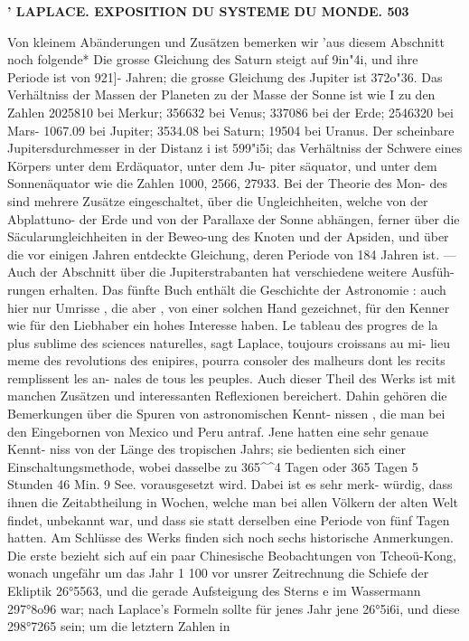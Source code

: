 \documentclass[12pt,a4paper]{article}
\begin{document}
\vspace{0.5em}


\noindent\textbf{'    LAPLACE.     EXPOSITION  DU  SYSTEME  DU  MONDE.  503}

Von  kleinem  Abänderungen  und  Zusätzen  bemerken  wir  'aus  diesem  Abschnitt  noch  folgende* Die  grosse  Gleichung  des  Saturn  steigt  auf  9in"4i,  und  ihre  Periode  ist  von  921]-  Jahren;  die  grosse Gleichung  des  Jupiter  ist  372o"36.  Das  Verhältniss  der  Massen  der  Planeten  zu  der  Masse  der  Sonne ist  wie  I  zu  den  Zahlen  2025810  bei  Merkur;  356632  bei  Venus;  337086  bei  der  Erde;  2546320  bei  Mars- 1067.09  bei  Jupiter;  3534.08  bei  Saturn;  19504  bei  Uranus.  Der  scheinbare  Jupitersdurchmesser  in  der Distanz  i  ist  599"i5i;  das  Verhältniss  der  Schwere  eines  Körpers  unter  dem  Erdäquator,  unter  dem  Ju- piter säquator,  und  unter  dem  Sonnenäquator  wie  die  Zahlen  1000,  2566,  27933.  Bei  der  Theorie  des  Mon- des sind  mehrere  Zusätze  eingeschaltet,  über  die  Ungleichheiten,  welche  von  der  Abplattuno-  der  Erde und  von  der  Parallaxe  der  Sonne  abhängen,  ferner  über  die  Säcularungleichheiten  in  der  Beweo-ung des  Knoten  und  der  Apsiden,  und  über  die  vor  einigen  Jahren  entdeckte  Gleichung,  deren  Periode  von 184  Jahren  ist.  ---  Auch  der  Abschnitt  über  die  Jupiterstrabanten  hat  verschiedene  weitere  Ausfüh- rungen erhalten. Das  fünfte  Buch  enthält  die  Geschichte  der  Astronomie :  auch  hier  nur  Umrisse ,  die  aber ,  von einer  solchen  Hand  gezeichnet,  für  den  Kenner  wie  für  den  Liebhaber  ein  hohes  Interesse  haben.  Le tableau  des  progres  de  la  plus  sublime  des  sciences  naturelles,  sagt  Laplace,  toujours  croissans  au  mi- lieu  meme  des  revolutions  des  enipires,  pourra  consoler  des  malheurs  dont  les  recits  remplissent  les  an- nales  de  tous  les  peuples.  Auch  dieser  Theil  des  Werks  ist  mit  manchen  Zusätzen  und  interessanten Reflexionen  bereichert.  Dahin  gehören  die  Bemerkungen  über  die  Spuren  von  astronomischen  Kennt- nissen ,  die  man  bei  den  Eingebornen  von  Mexico  und  Peru  antraf.  Jene  hatten  eine  sehr  genaue  Kennt- niss  von  der  Länge  des  tropischen  Jahrs;  sie  bedienten  sich  einer  Einschaltungsmethode,  wobei  dasselbe zu  365\textasciicircum{}\textasciicircum{}4  Tagen  oder  365  Tagen  5  Stunden  46  Min.  9  See.  vorausgesetzt  wird.  Dabei  ist  es  sehr  merk- würdig, dass  ihnen  die  Zeitabtheilung  in  Wochen,  welche  man  bei  allen  Völkern  der  alten  Welt  findet, unbekannt  war,  und  dass  sie  statt  derselben  eine  Periode  von  fünf  Tagen  hatten. Am  Schlüsse  des  Werks  finden  sich  noch  sechs  historische  Anmerkungen.  Die  erste  bezieht  sich auf  ein  paar  Chinesische  Beobachtungen  von  Tcheoü-Kong,  wonach  ungefähr  um  das  Jahr  1 100  vor  unsrer Zeitrechnung  die  Schiefe  der  Ekliptik  26°5563,  und  die  gerade  Aufsteigung  des  Sterns  e  im  Wassermann 297°8o96  war;  nach  Laplace's  Formeln  sollte  für  jenes  Jahr  jene  26°5i6i,  und  diese  298°7265  sein;  um  die letztern  Zahlen  in  
\end{document}

